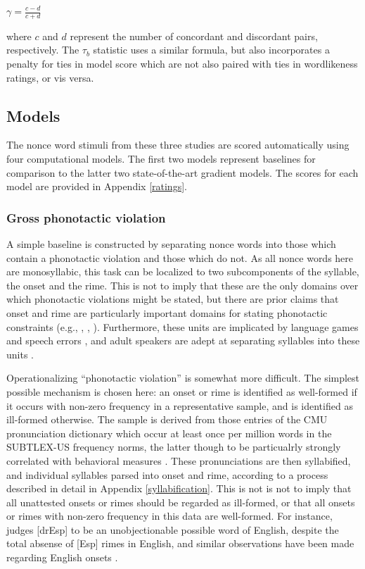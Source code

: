 \begin{unlabeledexample}
$\gamma = \displaystyle\frac{c - d}{c + d}$
\end{unlabeledexample}

\noindent
where $c$ and $d$ represent the number of concordant and discordant pairs, respectively. The $\tau_b$ statistic uses a similar formula, but also incorporates a penalty for ties in model score which are not also paired with ties in wordlikeness ratings, or vis versa. 

\subsection{Models}

The nonce word stimuli from these three studies are scored automatically using four computational models. The first two models represent baselines for comparison to the latter two state-of-the-art gradient models. The scores for each model are provided in Appendix \ref{ratings}.

\subsubsection{Gross phonotactic violation}

A simple baseline is constructed by separating nonce words into those which contain a phonotactic violation and those which do not. As all nonce words here are monosyllabic, this task can be localized to two subcomponents of the syllable, the onset and the rime. This is not to imply that these are the only domains over which phonotactic violations might be stated, but there are prior claims that onset and rime are particularly important domains for stating phonotactic constraints (e.g., \citealt{Fudge1969}, \citealt{Kessler1997}, \citealt{Treiman2000}). Furthermore, these units are implicated by language games \citep{Treiman1983} and speech errors \citep{Fowler1993}, and adult speakers are adept at separating syllables into these units \citep{Treiman1986,Treiman1995}.

Operationalizing ``phonotactic violation'' is somewhat more difficult. The simplest possible mechanism is chosen here: an onset or rime is identified as well-formed if it occurs with non-zero frequency in a representative sample, and is identified as ill-formed otherwise. The sample is derived from those entries of the CMU pronunciation dictionary which occur at least once per million words in the SUBTLEX-US frequency norms, the latter though to be particualrly strongly correlated with behavioral measures \citep{Brysbaert2009}. These pronunciations are then syllabified, and individual syllables parsed into onset and rime, according to a process described in detail in Appendix \ref{syllabification}. This is not is not to imply that all unattested onsets or rimes should be regarded as ill-formed, or that all onsets or rimes with non-zero frequency in this data are well-formed. For instance, \citet{Albright2009a} judges [drEsp] to be an unobjectionable possible word of English, despite the total absense of [Esp] rimes in English, and similar observations have been made regarding English onsets \citep[e.g.,][]{Cairns1972,Moreton2002}.

